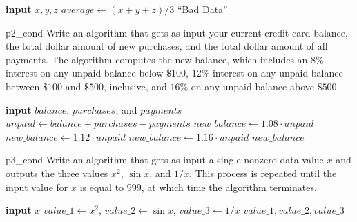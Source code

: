 \begin{algorithm}
	\caption*{Algorithm for problem ~\ref{prob:p1_cond}}
	\begin{algorithmic}[1]
		\State \textbf{input} $x, y, z$
			\State $average \gets (x + y + z)/3$
		\Else 
			\State \Output ``Bad Data''
		\EndIf
	\end{algorithmic}
\end{algorithm}

\begin{problem}{}{p2_cond}
Write an algorithm that gets as input your current credit card balance, the total dollar amount of new purchases, and the total dollar amount of all payments. The algorithm computes the new balance, which includes an $8\%$ interest on any unpaid balance below $\$100$, $12\%$ interest on any unpaid balance between $\$100$ and $\$500$, inclusive, and $16\%$ on any unpaid balance above $\$500$.
\end{problem}

\begin{algorithm}[H]
	\caption*{Algorithm for Problem ~\ref{prob:p2_cond}}
	\begin{algorithmic}[1]
		\State \textbf{input} $balance$, $purchases$, and $payments$
		\State $unpaid \gets balance + purchases - payments$
			\State $new\_balance\gets 1.08\cdot unpaid$
			\State $new\_balance\gets 1.12\cdot unpaid$
		\Else
			\State $new\_balance\gets 1.16\cdot unpaid$
		\EndIf
		\State \Output $new\_balance$
	\end{algorithmic}
\end{algorithm}

\begin{problem}{}{p3_cond}
Write an algorithm that gets as input a single nonzero data value $x$ and outputs the three values $x^2$, $\sin x$, and $1/x$. This process is repeated until the input value for $x$ is equal to $999$, at which time the algorithm terminates. 
\end{problem}

\begin{algorithm}[H]
	\caption*{Algorithm for Problem ~\ref{prob:p3_cond}}
	\begin{algorithmic}[1]
		\Repeat
			\State \textbf{input} $x$
			\State $value\_1 \gets x^2$, $value\_2 \gets \sin x$, $value\_3\gets 1/x$ 
			\State \Output $value\_1, value\_2, value\_3$
	\end{algorithmic}
\end{algorithm}


